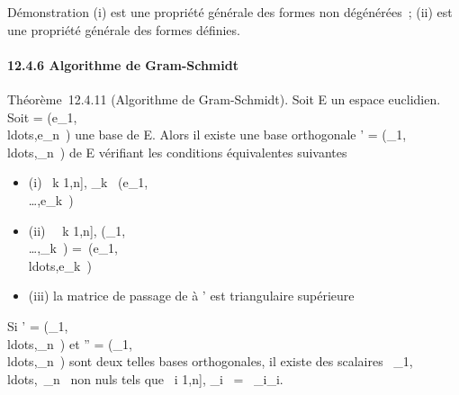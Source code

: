 \documentclass[]{article}
\begin{document}
Démonstration (i) est une propriété générale des formes non dégénérées~;
(ii) est une propriété générale des formes définies.

\paragraph{12.4.6 Algorithme de Gram-Schmidt}

Théorème~12.4.11 (Algorithme de Gram-Schmidt). Soit E un espace
euclidien. Soit  =
(e\_1,\\ldots,e\_n~)
une base de E. Alors il existe une base orthogonale ' =
(\epsilon\_1,\\ldots,\epsilon\_n~)
de E vérifiant les conditions équivalentes suivantes

\begin{itemize}
\itemsep1pt\parskip0pt
\item
  (i) \forall~k \in {[}1,n{]}, \epsilon\_k~
  \in\mathrmVect(e\_1,\\\ldots,e\_k~)
\item
  (ii) \forall~~k \in {[}1,n{]},
  \mathrmVect(\epsilon\_1,\\\ldots,\epsilon\_k~)
  =\
  \mathrmVect(e\_1,\\ldots,e\_k~)
\item
  (iii) la matrice de passage de  à ' est triangulaire supérieure
\end{itemize}

Si ' =
(\epsilon\_1,\\ldots,\epsilon\_n~)
et \mathcal{E}'' =
(\eta\_1,\\ldots,\eta\_n~)
sont deux telles bases orthogonales, il existe des scalaires
\lambda~\_1,\\ldots,\lambda~\_n~
non nuls tels que \forall~i \in {[}1,n{]}, \eta\_i~
= \lambda~\_i\epsilon\_i.
\end{document}
